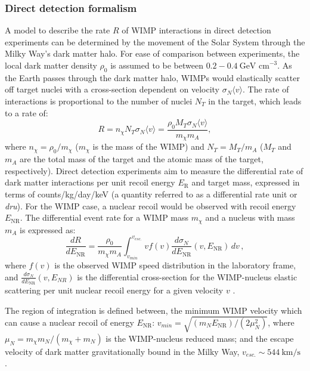 \subsubsection{Direct detection formalism}\label{sec:DMOverview/DDFormalism}
A model to describe the rate $R$ of WIMP interactions in direct detection experiments can be determined by the movement of the Solar System through the Milky Way's dark matter halo. For ease of comparison between experiments, the local dark matter density $\rho_0$ is assumed to be between $0.2-0.4~\text{GeV cm}^{-3}$\cite{Green:2011bv}. As the Earth passes through the dark matter halo, WIMPs would elastically scatter off target nuclei with a cross-section dependent on velocity $\sigma_N\langle v\rangle$. The rate of interactions is proportional to the number of nuclei $N_T$ in the target, which leads to a rate of:
\begin{equation}
    R=n_\chi N_T\sigma_N\langle v\rangle=\frac{\rho_0M_T\sigma_N\langle v\rangle}{m_\chi m_A},
\end{equation}
where $n_\chi=\rho_0/m_\chi$ ($m_\chi$ is the mass of the WIMP) and $N_T=M_T/m_A$ ($M_T$ and $m_A$ are the total mass of the target and the atomic mass of the target, respectively). Direct detection experiments aim to measure the differential rate of dark matter interactions per unit recoil energy $E_\text{R}$ and target mass, expressed in terms of counts/kg/day/keV (a quantity referred to as a differential rate unit or \textit{dru})\cite{Cerdeno:2010jj}. 
For the WIMP case, a nuclear recoil would be observed with recoil energy $E_\text{NR}$. The differential event rate for a WIMP mass $m_\chi$ and a nucleus with mass $m_A$ is expressed as:
\begin{equation}
  \frac{dR}{dE_\text{NR}}=\frac{\rho_0}{m_\chi m_A}\int_{v_{min}}^{v_{esc.}}  v
  f(v) \frac{d\sigma_N}{dE_\text{NR}}(v,E_\text{NR})\, d v\,,
  \label{eqn:diff_rate}
\end{equation}
where $f(v)$ is the observed WIMP speed distribution in the laboratory frame, and $\frac{d\sigma_N}{dE_\text{NR}}(v,E_{NR})$ is the differential cross-section for the WIMP-nucleus elastic scattering per unit nuclear recoil energy for a given velocity $v$ \cite{jaalbers:thesis}.

The region of integration is defined between, the minimum WIMP velocity which can cause a nuclear recoil of energy $E_\text{NR}$: $v_{min}=\sqrt{(m_NE_\text{NR})/(2\mu_N^2)}$, where $\mu_N=m_\chi m_N/(m_\chi+m_N)$ is the WIMP-nucleus reduced mass; and the escape velocity of dark matter gravitationally bound in the Milky Way, $v_{esc.}\sim544~\text{km/s}$ \cite{OlcinaSamblas:thesis}. 

